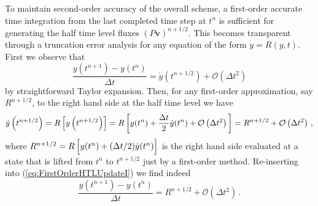 \documentclass{ametsoc}
\newcommand{\sblue}[1]{\textcolor{sblue}{#1}}
\newcommand{\revision}[1]{\sblue{#1}}
\theoremstyle{definition}
\newcommand{\eq}[1]{(\ref{#1})}
\newcommand{\vect}[1]{{\mathbf{#1}}}
\newcommand{\vv}{\vect{v}}
\newcommand{\half}{1/2}
\newcommand{\dt}{\Delta t}
\newcommand{\bigoh}[1]{\mathcal{O}\left(#1\right)}
\begin{document}
\begin{appendix}[A]\label{sec: appA}%

\revision{To maintain second-order accuracy of the overall scheme, a first-order accurate 
time integration from the last completed time step at $t^n$ is sufficient for 
generating the half time level fluxes $(P\vv)^{n+\half}$. This becomes transparent through a truncation error analysis for any equation of 
the form $\dot y = R(y,t)$. First we observe that
%
\begin{equation}\label{eq:FirstOrderHTLUpdateI}
\frac{y(t^{n+1})-y(t^n)}{\dt} = \dot y\left(t^{n+\half}\right) + \bigoh{\dt^2}
\end{equation}
%
by straightforward Taylor expansion. Then, for any first-order approximation, 
say $R^{n+\half}$, to the right hand side at the half time level we have  
%
\begin{equation}\label{eq:FirstOrderHTLUpdateII}
\dot y\left(t^{n+\half}\right) 
= R\left[y\left(t^{n+\half}\right)\right] 
= R\left[y(t^n) + \frac{\Delta t}{2} \dot y(t^n) + \bigoh{\Delta t^2}\rule{0pt}{12pt}\right]
= R^{n+\half} + \bigoh{\dt^2}\,,
\end{equation}
%
where $R^{n+\half} = R\left[y(t^n) + (\Delta t/2) \dot y(t^n)\rule{0pt}{10pt}\right]$ is the right hand side evaluated at a state that is lifted from $t^n$ to $t^{n+\half}$ just by a first-order method. Re-inserting into \eq{eq:FirstOrderHTLUpdateI} we find indeed
%
\begin{equation}
\frac{y(t^{n+1})-y(t^n)}{\dt} = R^{n+\half} + \bigoh{\dt^2}\, .
\end{equation}}
%
\end{appendix}
\end{document}
